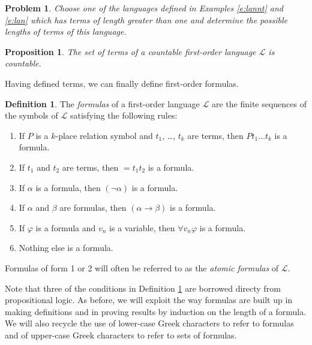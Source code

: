 \documentclass[12pt]{amsbook}
\theoremstyle{plain}
\newtheorem{prop}[thm]{Proposition}
\newtheorem{prob}[thm]{Problem}
\theoremstyle{definition}
\newtheorem{defn}{Definition}[chapter]
\theoremstyle{remark}
\begin{document}
\begin{prob} \label{p:five2}
Choose one of the languages defined in Examples \ref{e:lannt} and \ref{e:lan} which has terms of length greater than one and determine the possible lengths of terms of this language.
\end{prob}

\begin{prop} \label{p:fcmt}
The set of terms of a countable first-order language $\mathcal{L}$ is countable.
\end{prop}

Having defined terms,  we can finally define first-order formulas.

\begin{defn} \label{d:for} 
The {\em formulas\/} of a first-order language $\mathcal{L}$ are the finite sequences of the symbols of $\mathcal{L}$ satisfying the following rules:
\begin{enumerate}
\item If $P$ is a $k$-place relation symbol and $t_1$,  \dots,
$t_k$ are terms,  then  $P t_1 \dots t_k$ is a formula.
\item If $t_1$ and $t_2$ are terms,  then $= t_1 t_2$ is a formula.
\item If $\alpha$ is a formula,  then $(\lnot \alpha)$ is a formula.
\item If $\alpha$ and $\beta$ are formulas,  then $(\alpha \to \beta)$ is a formula.
\item If $\varphi$ is a formula and $v_n$ is a variable,  then $\forall v_n \varphi$ is a formula.
\item Nothing else is a formula.
\end{enumerate}
Formulas of form 1 or 2 will often be referred to as the {\em atomic formulas\/}  of $\mathcal{L}$. 
\end{defn}

Note that three of the conditions in Definition \ref{d:for} are borrowed directy from propositional logic.  As before,  we will exploit the way formulas are built up in making definitions and in proving results by induction on the length of a formula.  We will also recycle the use of lower-case Greek characters to refer to formulas and of upper-case Greek characters to refer to sets of formulas.
\end{document}
